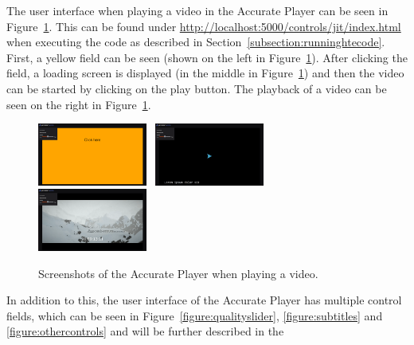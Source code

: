 \documentclass[../MasterThesis.tex]{subfiles}
\begin{document}
\hypersetup{urlcolor=black}
The user interface when playing a video in the Accurate Player can be seen in Figure~\ref{figure:AV_before}. This can be found under \url{http://localhost:5000/controls/jit/index.html} when executing the code as described in Section~\ref{subsection:runninghtecode}.
First, a yellow field can be seen (shown on the left in Figure~\ref{figure:AV_before}). After clicking the field, a loading screen is displayed (in the middle in Figure~\ref{figure:AV_before}) and then the video can be started by clicking on the play button. The playback of a video can be seen on the right in Figure~\ref{figure:AV_before}.


\begin{figure}[H]
	\begin{center}
		\includegraphics[width=0.32\textwidth]{AV1_before.png} \ 
		\includegraphics[width=0.32\textwidth]{AV2_before.png} \ 
		\includegraphics[width=0.32\textwidth]{AV3_before.png}
		\caption[Screenshots of the frontend.]{Screenshots of the Accurate Player when playing a video.}
		\label{figure:AV_before}
	\end{center}
\end{figure}
%
%
%
%
%
%
%
%
%
\sodef{}
%
In addition to this, the user interface of the Accurate Player has multiple control fields, which can be seen in Figure~\ref{figure:qualityslider}, \ref{figure:subtitles} and \ref{figure:othercontrols} and will be further described in the 
%
\end{document}
